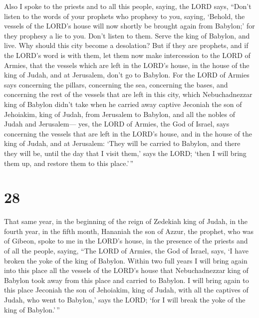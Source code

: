  Also I spoke to the priests and to all this people,
saying, the LORD says, ``Don't listen to the words of your prophets who
prophesy to you, saying, `Behold, the vessels of the LORD's house will
now shortly be brought again from Babylon;' for they prophesy a lie to
you.  Don't listen to them. Serve the king of Babylon, and
live. Why should this city become a desolation?  But if
they are prophets, and if the LORD's word is with them, let them now
make intercession to the LORD of Armies, that the vessels which are left
in the LORD's house, in the house of the king of Judah, and at
Jerusalem, don't go to Babylon.  For the LORD of Armies
says concerning the pillars, concerning the sea, concerning the bases,
and concerning the rest of the vessels that are left in this city,
 which Nebuchadnezzar king of Babylon didn't take when he
carried away captive Jeconiah the son of Jehoiakim, king of Judah, from
Jerusalem to Babylon, and all the nobles of Judah and Jerusalem---
 yes, the LORD of Armies, the God of Israel, says
concerning the vessels that are left in the LORD's house, and in the
house of the king of Judah, and at Jerusalem:  `They will
be carried to Babylon, and there they will be, until the day that I
visit them,' says the LORD; `then I will bring them up, and restore them
to this place.'\,''

\hypertarget{section-27}{%
\section{28}\label{section-27}}

 That same year, in the beginning of the reign of Zedekiah
king of Judah, in the fourth year, in the fifth month, Hananiah the son
of Azzur, the prophet, who was of Gibeon, spoke to me in the LORD's
house, in the presence of the priests and of all the people, saying,
 ``The LORD of Armies, the God of Israel, says, `I have
broken the yoke of the king of Babylon.  Within two full
years I will bring again into this place all the vessels of the LORD's
house that Nebuchadnezzar king of Babylon took away from this place and
carried to Babylon.  I will bring again to this place
Jeconiah the son of Jehoiakim, king of Judah, with all the captives of
Judah, who went to Babylon,' says the LORD; `for I will break the yoke
of the king of Babylon.'\,''

